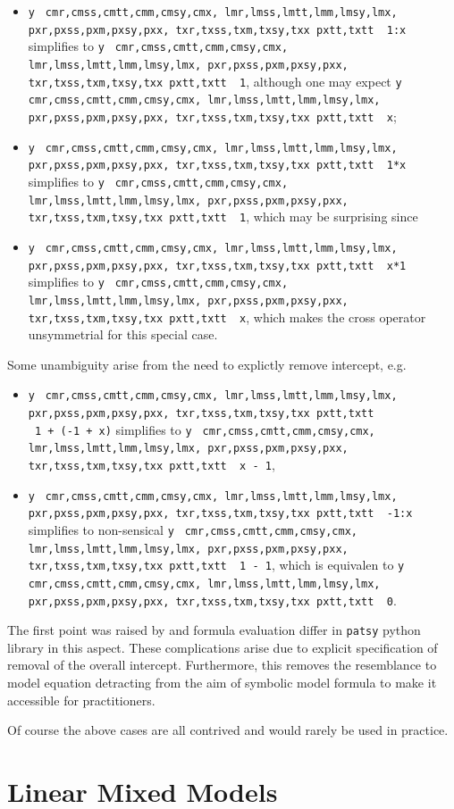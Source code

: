 \documentclass[runningheads]{llncs}
\makeatletter
\providecommand{\tightlist}{%
  \setlength{\itemsep}{0pt}\setlength{\parskip}{0pt}}
\newcommand\midtilde@raisedtilde[1][.5]{\raisebox{#1ex}{\texttildelow}}
\def\midtilde@normaltilde{\texttildelow}
\newcommand\midtilde%
{%
  \expandafter\in@\expandafter{\f@family}%
    {cmr,cmss,cmtt,cmm,cmsy,cmx,%
    lmr,lmss,lmtt,lmm,lmsy,lmx,%
    pxr,pxss,pxm,pxsy,pxx,%
    txr,txss,txm,txsy,txx}%
  \ifin@%
    \midtilde@raisedtilde%
  \else%
    \expandafter\in@\expandafter{\f@family}%
    {pxtt,txtt}%
    \ifin@%
      \midtilde@raisedtilde[.35]%
    \else%
      \midtilde@normaltilde%
    \fi%
  \fi%
}
\makeatother
\begin{document}
\begin{itemize}
\tightlist
\item
  \texttt{y} \texttt{\midtilde\ }\texttt{1:x} simplifies to \texttt{y} \texttt{\midtilde\ }\texttt{1}, although one may expect \texttt{y} \texttt{\midtilde\ }\texttt{x};
\item
  \texttt{y} \texttt{\midtilde\ }\texttt{1*x} simplifies to \texttt{y} \texttt{\midtilde\ }\texttt{1}, which may be surprising since
\item
  \texttt{y} \texttt{\midtilde\ }\texttt{x*1} simplifies to \texttt{y} \texttt{\midtilde\ }\texttt{x}, which makes the cross operator unsymmetrial for this special case.
\end{itemize}

Some unambiguity arise from the need to explictly remove intercept, e.g.

\begin{itemize}
\tightlist
\item
  \texttt{y} \texttt{\midtilde\ }\texttt{1\ +\ (-1\ +\ x)} simplifies to \texttt{y} \texttt{\midtilde\ }\texttt{x\ -\ 1},
\item
  \texttt{y} \texttt{\midtilde\ }\texttt{-1:x} simplifies to non-sensical \texttt{y} \texttt{\midtilde\ }\texttt{1\ -\ 1}, which is equivalen to \texttt{y} \texttt{\midtilde\ }\texttt{0}.
\end{itemize}

The first point was raised by \textcite{patsy} and formula evaluation differ in \texttt{patsy} python library in this aspect. These complications arise due to explicit specification of removal of the overall intercept. Furthermore, this removes the resemblance to model equation detracting from the aim of symbolic model formula to make it accessible for practitioners.

Of course the above cases are all contrived and would rarely be used in practice.

\hypertarget{lmm}{%
\section{Linear Mixed Models}\label{lmm}}
\end{document}
